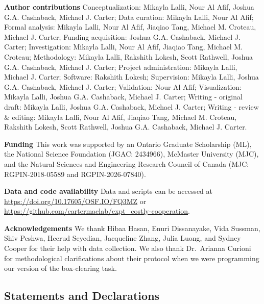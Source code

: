 \documentclass[
  11pt,
  letterpaper,
]{article}
\begin{document}
\clearpage

\noindent  \textbf{Author contributions} \hspace{0.5em}
Conceptualization: Mikayla Lalli, Nour Al Afif, Joshua G.A. Cashaback,
Michael J. Carter; Data curation: Mikayla Lalli, Nour Al Afif; Formal
analysis: Mikayla Lalli, Nour Al Afif, Jiaqiao Tang, Michael M. Croteau,
Michael J. Carter; Funding acquisition: Joshua G.A. Cashaback, Michael
J. Carter; Investigation: Mikayla Lalli, Nour Al Afif, Jiaqiao Tang,
Michael M. Croteau; Methodology: Mikayla Lalli, Rakshith Lokesh, Scott
Rathwell, Joshua G.A. Cashaback, Michael J. Carter; Project
administration: Mikayla Lalli, Michael J. Carter; Software: Rakshith
Lokesh; Supervision: Mikayla Lalli, Joshua G.A. Cashaback, Michael J.
Carter; Validation: Nour Al Afif; Visualization: Mikayla Lalli, Joshua
G.A. Cashaback, Michael J. Carter; Writing - original draft: Mikayla
Lalli, Joshua G.A. Cashaback, Michael J. Carter; Writing - review \&
editing: Mikayla Lalli, Nour Al Afif, Jiaqiao Tang, Michael M. Croteau,
Rakshith Lokesh, Scott Rathwell, Joshua G.A. Cashaback, Michael J.
Carter.

\vspace{5pt}

\noindent \textbf{Funding} \hspace{0.5em} This work was supported by an
Ontario Graduate Scholarship (ML), the National Science Foundation
(JGAC: 2434966), McMaster University (MJC), and the Natural Sciences and
Engineering Research Council of Canada (MJC: RGPIN-2018-05589 and
RGPIN-2026-07840).

\vspace{5pt}

\noindent \textbf{Data and code availability} \hspace{0.5em} Data and
scripts can be accessed at \url{https://doi.org/10.17605/OSF.IO/FQ3MZ}
or \url{https://github.com/cartermaclab/expt_costly-cooperation}.

\vspace{5pt}

\noindent \textbf{Acknowledgements} \hspace{0.5em} We thank Hibaa Hasan,
Enuri Dissanayake, Vida Sussman, Shiv Peshwa, Heerud Seyedian,
Jacqueline Zhang, Julia Luong, and Sydney Cooper for their help with
data collection. We also thank Dr.~Arianna Curioni for methodological
clarifications about their protocol when we were programming our version
of the box-clearing task.

\subsection{Statements and
Declarations}\label{statements-and-declarations}
\end{document}
